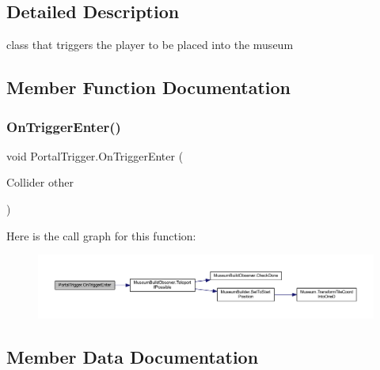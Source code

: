 \subsection{Detailed Description}
class that triggers the player to be placed into the museum 



\subsection{Member Function Documentation}
\mbox{\label{class_portal_trigger_ae73070bf23c6348ced79aa839e0e2ad7}} 
\subsubsection{\texorpdfstring{On\+Trigger\+Enter()}{OnTriggerEnter()}}
{\footnotesize\ttfamily void Portal\+Trigger.\+On\+Trigger\+Enter (\begin{DoxyParamCaption}\item[{Collider}]{other }\end{DoxyParamCaption})\hspace{0.3cm}{\ttfamily [private]}}

Here is the call graph for this function\+:
\nopagebreak
\begin{figure}[H]
\begin{center}
\leavevmode
\includegraphics[width=350pt]{class_portal_trigger_ae73070bf23c6348ced79aa839e0e2ad7_cgraph}
\end{center}
\end{figure}


\subsection{Member Data Documentation}
\mbox{\label{class_portal_trigger_a26ee63b0f443863cd4bc7a2626063f5b}} 
